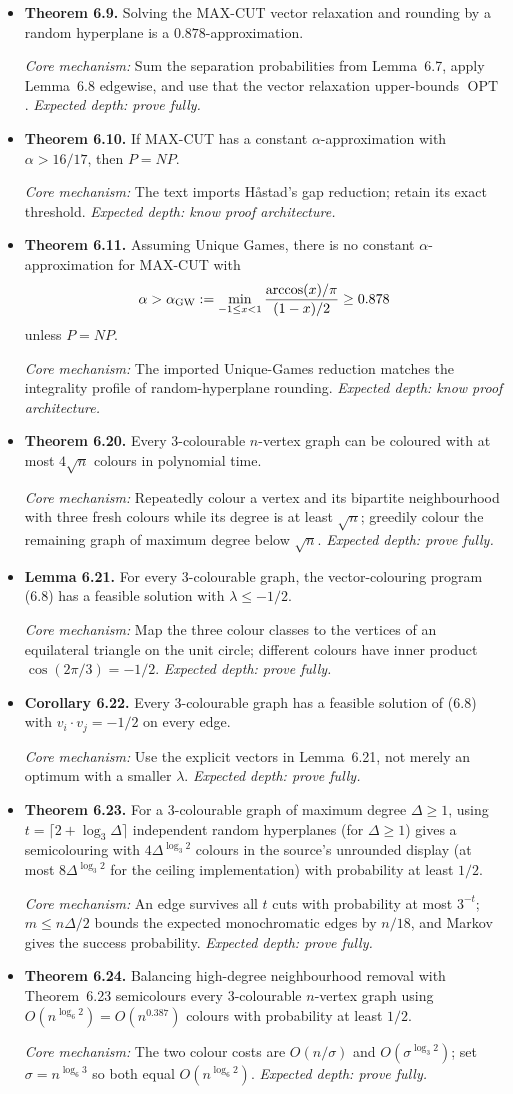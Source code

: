 \documentclass[11pt,a4paper]{article}
\newcommand{\OPT}{\operatorname{OPT}}
\newcommand{\1}{\mathbf 1}
\newcommand{\catalogue}[4]{%
  \item \textbf{#1.} #2\par
  {\footnotesize\emph{Core mechanism:} #3
  \emph{Expected depth: #4.}}}
\begin{document}
\begin{itemize}
\catalogue{Theorem 6.9}{Solving the MAX-CUT vector relaxation and rounding by
a random hyperplane is a $0.878$-approximation.}{Sum the separation
probabilities from Lemma~6.7, apply Lemma~6.8 edgewise, and use that the vector
relaxation upper-bounds $\OPT$.}{prove fully}

\catalogue{Theorem 6.10}{If MAX-CUT has a constant
$\alpha$-approximation with $\alpha>16/17$, then $P=NP$.}{The text imports
Håstad's gap reduction; retain its exact threshold.}{know proof architecture}

\catalogue{Theorem 6.11}{Assuming Unique Games, there is no constant
$\alpha$-approximation for MAX-CUT with
\[
\alpha>\alpha_{\rm GW}:=
\min_{-1\leq x<1}
\frac{\arccos(x)/\pi}{(1-x)/2}\geq0.878
\]
unless $P=NP$.}{The imported Unique-Games reduction matches the integrality
profile of random-hyperplane rounding.}{know proof architecture}

\catalogue{Theorem 6.20}{Every $3$-colourable $n$-vertex graph can be coloured
with at most $4\sqrt n$ colours in polynomial time.}{Repeatedly colour a
vertex and its bipartite neighbourhood with three fresh colours while its
degree is at least $\sqrt n$; greedily colour the remaining graph of maximum
degree below $\sqrt n$.}{prove fully}

\catalogue{Lemma 6.21}{For every $3$-colourable graph, the vector-colouring
program (6.8) has a feasible solution with $\lambda\leq-1/2$.}{Map the three
colour classes to the vertices of an equilateral triangle on the unit circle;
different colours have inner product $\cos(2\pi/3)=-1/2$.}{prove fully}

\catalogue{Corollary 6.22}{Every $3$-colourable graph has a feasible solution
of (6.8) with $v_i\cdot v_j=-1/2$ on every edge.}{Use the explicit vectors in
Lemma~6.21, not merely an optimum with a smaller $\lambda$.}{prove fully}

\catalogue{Theorem 6.23}{For a $3$-colourable graph of maximum degree
$\Delta\geq1$, using $t=\lceil2+\log_3\Delta\rceil$ independent random hyperplanes (for $\Delta\geq1$) gives a
semicolouring with $4\Delta^{\log_3 2}$ colours in the source's unrounded display (at most $8\Delta^{\log_3 2}$ for the ceiling implementation) with probability at least
$1/2$.}{An edge survives all $t$ cuts with probability at most $3^{-t}$;
$m\leq n\Delta/2$ bounds the expected monochromatic edges by $n/18$, and
Markov gives the success probability.}{prove fully}

\catalogue{Theorem 6.24}{Balancing high-degree neighbourhood removal with
Theorem~6.23 semicolours every $3$-colourable $n$-vertex graph using
$O(n^{\log_6 2})=O(n^{0.387})$ colours with probability at least $1/2$.}
{The two colour costs are $O(n/\sigma)$ and
$O(\sigma^{\log_3 2})$; set $\sigma=n^{\log_6 3}$ so both equal
$O(n^{\log_6 2})$.}{prove fully}


\end{itemize}
\end{document}
